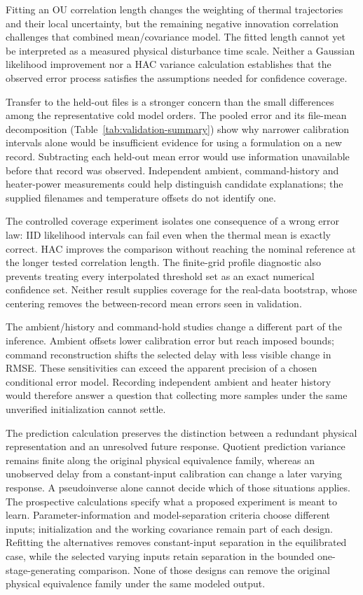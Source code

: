 Fitting an OU correlation length
changes the weighting of thermal trajectories and their local uncertainty, but
the remaining negative innovation correlation challenges that combined
mean/covariance model. The fitted length cannot yet be interpreted as a measured
physical disturbance time scale. Neither a Gaussian likelihood improvement nor
a HAC variance calculation establishes that the observed error process satisfies
the assumptions needed for confidence coverage.

Transfer to the held-out files is a stronger concern than the small differences
among the representative cold model orders. The pooled error and its file-mean
decomposition (Table~\ref{tab:validation-summary}) show why narrower calibration
intervals alone would be insufficient evidence for using a formulation on a new
record. Subtracting each held-out mean error would use information unavailable
before that record was observed. Independent ambient, command-history and
heater-power measurements could help distinguish candidate explanations;
the supplied filenames and temperature offsets do not identify one.

The controlled coverage experiment isolates one consequence of a wrong error
law: IID likelihood intervals can fail even when the thermal mean is exactly
correct. HAC improves the comparison without reaching the nominal reference
at the longer tested correlation length. The finite-grid profile diagnostic
also prevents treating every interpolated threshold set as an exact numerical
confidence set. Neither result supplies coverage for the real-data bootstrap,
whose centering removes the between-record mean errors seen in validation.

The ambient/history and command-hold studies change a different part of the
inference. Ambient offsets lower calibration error but reach imposed bounds;
command reconstruction shifts the selected delay with less visible change in
RMSE. These sensitivities can exceed the apparent precision of a chosen
conditional error model. Recording independent ambient and heater history would
therefore answer a question that collecting more samples under the same
unverified initialization cannot settle.

The prediction calculation preserves the distinction between a redundant
physical representation and an unresolved future response. Quotient prediction
variance remains finite along the original physical equivalence family, whereas
an unobserved delay from a constant-input calibration can change a later varying
response. A pseudoinverse alone cannot decide which of those situations applies.
The prospective calculations specify what a proposed experiment is meant to
learn. Parameter-information and model-separation criteria choose different
inputs; initialization and the working covariance remain part of each design.
Refitting the alternatives removes constant-input separation in the equilibrated
case, while the selected varying inputs retain separation in the bounded
one-stage-generating comparison. None of those designs can remove the original
physical equivalence family under the same modeled output.


